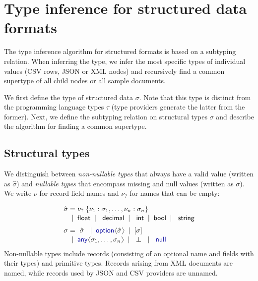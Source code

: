 \documentclass[10pt,preprint,blind,clearpagebib]{sigplanconf}
\newcommand{\langl}{\begin{picture}(4.5,7)
\put(1.1,2.5){\rotatebox{60}{\line(1,0){5.5}}}
\put(1.1,2.5){\rotatebox{300}{\line(1,0){5.5}}}
\end{picture}}
\newcommand{\rangl}{\begin{picture}(4.5,7)
\put(.9,2.5){\rotatebox{120}{\line(1,0){5.5}}}
\put(.9,2.5){\rotatebox{240}{\line(1,0){5.5}}}
\end{picture}}
\newcommand{\kvd}[1]{\textnormal{\textcolor{kvdclr}{\sffamily #1}}}
\newcommand{\ident}[1]{\textnormal{\sffamily #1}}
\newcommand{\lsep}[0]{\;\; | \;\;}
\newcommand{\narrow}[1]{\hspace{-0.7em} #1 \hspace{-0.7em}}
\begin{document}
\section{Type inference for structured data formats}
\label{sec:inference}

The type inference algorithm for structured formats is based on a subtyping relation. When 
inferring the type, we infer the most specific types of individual values (CSV rows, JSON or XML 
nodes) and recursively find a common supertype of all child nodes or all sample documents.

We first define the type of structured data $\sigma$. Note that this type is distinct 
from the programming language types $\tau$ (type providers generate the latter from the former). 
Next, we define the subtyping relation on structural types $\sigma$ and describe the algorithm 
for finding a common supertype. 

\subsection{Structural types}
\label{sec:inference-types}

We distinguish between \emph{non-nullable types} that always have a valid value (written as 
$\hat{\sigma}$) and \emph{nullable types} that encompass missing and \kvd{null} values 
(written as $\sigma$). We write $\nu$ for record field names and $\nu_?$ for names that can be empty:

\noindent
\begin{equation*}
\begin{array}{rcl}
 \hat{\sigma} &\narrow{=}& \nu_?\; \{ \nu_1 : \sigma_1, \ldots, \nu_n : \sigma_n \} \\[0.1em]
                &\narrow{|}& \ident{float} \lsep \ident{decimal} \lsep \ident{int} \lsep \ident{bool} \lsep \ident{string} 
 \\[0.6em] 
       \sigma &\narrow{=}& ~\hat{\sigma}~ \lsep \kvd{option}\langl \hat{\sigma} \rangl \lsep [\sigma] \\[0.1em]
              &\narrow{|}& \kvd{any}\langl\sigma_1, \ldots, \sigma_n\rangl \lsep ~\bot~ \lsep \kvd{null}
\end{array}
\end{equation*}
%
Non-nullable types include records (consisting of an optional name and fields with their types) 
and primitive types. Records arising from XML documents are named, while records used by 
JSON and CSV providers are unnamed. 
\end{document}
